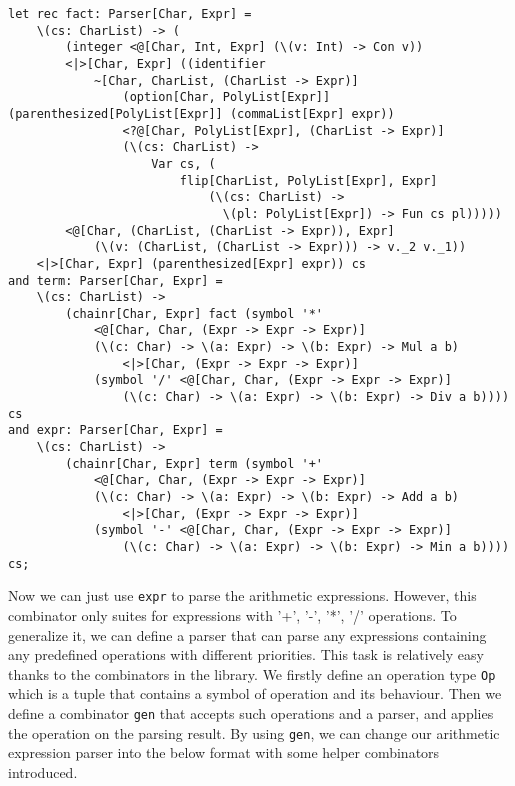 \begin{lstlisting}
let rec fact: Parser[Char, Expr] =
    \(cs: CharList) -> (
        (integer <@[Char, Int, Expr] (\(v: Int) -> Con v))
        <|>[Char, Expr] ((identifier
            ~[Char, CharList, (CharList -> Expr)]
                (option[Char, PolyList[Expr]] (parenthesized[PolyList[Expr]] (commaList[Expr] expr))
                <?@[Char, PolyList[Expr], (CharList -> Expr)]
                (\(cs: CharList) ->
                    Var cs, (
                        flip[CharList, PolyList[Expr], Expr]
                            (\(cs: CharList) ->
                              \(pl: PolyList[Expr]) -> Fun cs pl)))))
        <@[Char, (CharList, (CharList -> Expr)), Expr]
            (\(v: (CharList, (CharList -> Expr))) -> v._2 v._1))
    <|>[Char, Expr] (parenthesized[Expr] expr)) cs
and term: Parser[Char, Expr] =
    \(cs: CharList) ->
        (chainr[Char, Expr] fact (symbol '*'
            <@[Char, Char, (Expr -> Expr -> Expr)]
            (\(c: Char) -> \(a: Expr) -> \(b: Expr) -> Mul a b)
                <|>[Char, (Expr -> Expr -> Expr)]
            (symbol '/' <@[Char, Char, (Expr -> Expr -> Expr)]
                (\(c: Char) -> \(a: Expr) -> \(b: Expr) -> Div a b)))) cs
and expr: Parser[Char, Expr] =
    \(cs: CharList) ->
        (chainr[Char, Expr] term (symbol '+'
            <@[Char, Char, (Expr -> Expr -> Expr)]
            (\(c: Char) -> \(a: Expr) -> \(b: Expr) -> Add a b)
                <|>[Char, (Expr -> Expr -> Expr)]
            (symbol '-' <@[Char, Char, (Expr -> Expr -> Expr)]
                (\(c: Char) -> \(a: Expr) -> \(b: Expr) -> Min a b)))) cs;
\end{lstlisting}

Now we can just use \texttt{expr} to parse the arithmetic expressions. However, this combinator only suites for expressions with '+', '-', '*', '/' operations. To generalize it, we can define a parser that can parse any expressions containing any predefined operations with different priorities. This task is relatively easy thanks to the combinators in the library. We firstly define an operation type \texttt{Op} which is a tuple that contains a symbol of operation and its behaviour. Then we define a combinator \texttt{gen} that accepts such operations and a parser, and applies the operation on the parsing result. By using \texttt{gen}, we can change our arithmetic expression parser into the below format with some helper combinators introduced.

